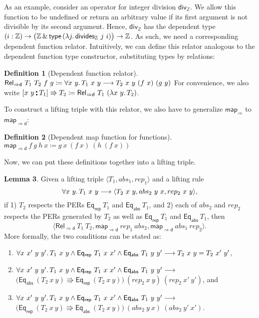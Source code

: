 \documentclass{article}
\theoremstyle{definition}
\newtheorem{definition}{Definition}[section]
\newtheorem{lemma}[definition]{Lemma}
\newcommand{\eqrep}{\mathsf{Eq_{rep}}}
\newcommand{\eqabs}{\mathsf{Eq_{abs}}}
\newcommand{\mapfun}{\mathsf{map_\Rightarrow}}
\newcommand{\mapfund}{\mathsf{map_{\Rightarrow d}}}
\newcommand{\relfund}{\mathsf{Rel_{\Rightarrow d}}}
\newcommand{\inte}{\mathbb{Z}}
\newcommand{\related}{\mathbin{\raisebox{-0.5pt}{$\centerdot$} \hspace{-2.9pt} \raisebox{3.5pt}{$\centerdot$}}}
\begin{document}
As an example, consider an operator for integer division \(\mathsf{div_\inte}\).
We allow this function to be undefined or return an arbitrary value if its first argument is not divisible by its second argument.
Hence, \(\mathsf{div_\inte}\) has the dependent type \((i : \inte) \rightarrow \bigl(\inte \, \&\,  \mathsf{type}\, (\lambda j\ldotp \mathsf{divides_\inte}\ j\ i)\bigr) \rightarrow \inte\).
As such, we need a corresponding dependent function relator.
Intuitively, we can define this relator analogous to the dependent function type constructor, substituting types by relations:
\begin{definition}[Dependent function relator]
	\(\relfund\ T_1\ T_2\ f\ g \coloneqq \forall x\ y\ldotp T_1\ x\ y \longrightarrow T_2\ x\ y\ (f\ x)\ (g\ y)\)
For convenience, we also write
$[x\ y \related T_1] \Rrightarrow T_2 \coloneqq \relfund\ T_1\ (\lambda x\ y\ldotp T_2)$.
\end{definition}
To construct a lifting triple with this relator,
we also have to generalize \(\mapfun\) to \(\mapfund\):
\begin{definition}[Dependent map function for functions]
\(\mapfund\ f\ g\ h\ x \coloneqq g\ x\ (f\ x)\ (h\ (f\ x))\)
\end{definition}
Now, we can put these definitions together into a lifting triple.
\begin{lemma}
Given a lifting triple $\langle T_1, abs_1, rep_1 \rangle$
and a lifting rule
\begin{equation*}
	\forall x\ y \ldotp T_1\ x\ y \longrightarrow \langle T_2\ x\ y, abs_2\ y\ x, rep_2\ x\ y\rangle,
\end{equation*}
if 1) \(T_2\) respects the PERs \(\eqrep\ T_1\) and \(\eqabs\ T_1\),
and 2) each of \(abs_2\) and \(rep_2\) respects the PERs generated by $T_2$ as well as \(\eqrep\ T_1\) and \(\eqabs\ T_1\),
then
\begin{equation*}
	\langle \relfund\ T_1\ T_2, \mapfund\ rep_1\ abs_2, \mapfund\ abs_1\ rep_2 \rangle.
\end{equation*}
More formally, the two conditions can be stated as:
\begin{enumerate}
	\item \(\forall x\ x'\ y\ y' \ldotp T_1\ x\ y \land \eqrep\ T_1\ x\ x' \land \eqabs\ T_1\ y\ y' \longrightarrow T_2\ x\ y = T_2\ x'\ y'\),
	\item \(\forall x\ x'\ y\ y' \ldotp T_1\ x\ y \land \eqrep\ T_1\ x\ x' \land \eqabs\ T_1\ y\ y' \longrightarrow\) \\
	\null\quad$\bigl(\eqabs\ (T_2\ x\ y) \Rrightarrow \eqrep\ (T_2\ x\ y)\bigr)\ (rep_2\ x\ y)\ (rep_2\ x'\ y')$, and
	\item \(\forall x\ x'\ y\ y' \ldotp T_1\ x\ y \land \eqrep\ T_1\ x\ x' \land \eqabs\ T_1\ y\ y' \longrightarrow \) \\
	\null\quad$\bigl(\eqrep\ (T_2\ x\ y) \Rrightarrow \eqabs\ (T_2\ x\ y)\bigr)\ (abs_2\ y\ x)\ (abs_2\ y'\ x')$.
\end{enumerate}
\end{lemma}
\end{document}
